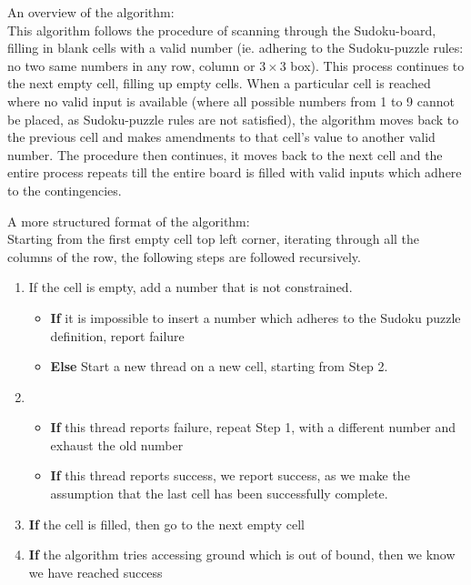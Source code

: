 \documentclass[12pt]{article}
\begin{document}
\begin{flushleft}
An overview of the algorithm:\\
This algorithm follows the procedure of scanning through the Sudoku-board, filling in blank cells with a valid number (ie. adhering to the Sudoku-puzzle rules: no two same numbers in any row, column or $3\times3$ box). This process continues to the next empty cell, filling up empty cells. When a particular cell is reached where no valid input is available (where all possible numbers from 1 to 9 cannot be placed, as Sudoku-puzzle rules are not satisfied), the algorithm moves back to the previous cell and makes amendments to that cell's value to another valid number. The procedure then continues, it moves back to the next cell and the entire process repeats till the entire board is filled with valid inputs which adhere to the contingencies. 
\end{flushleft}

\begin{flushleft}
A more structured format of the algorithm: \\
Starting from the first empty cell top left corner, iterating through all the columns of the row, the following steps are followed recursively. \\
\begin{enumerate}
\item If the cell is empty, add a number that is not constrained.
\begin{itemize}
\item \textbf{If} it is impossible to insert a number which adheres to the Sudoku puzzle definition, report failure 
\item \textbf{Else} Start a new thread on a new cell, starting from Step 2.
\end{itemize}

\item
\begin{itemize}
\item \textbf{If} this thread reports failure, repeat Step 1, with a different number and exhaust the old number
\item \textbf{If} this thread reports success, we report success, as we make the assumption that the last cell has been successfully complete.  
\end{itemize}
\item \textbf{If} the cell is filled, then go to the next empty cell
\item \textbf{If} the algorithm tries accessing ground which is out of bound, then we know we have reached success

\end{enumerate}
\end{flushleft}
\end{document}

